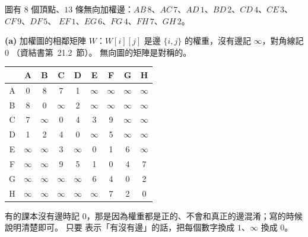 \begin{pastsoln}
圖有 $8$ 個頂點、$13$ 條無向加權邊：$AB\,8$、$AC\,7$、$AD\,1$、$BD\,2$、$CD\,4$、$CE\,3$、$CF\,9$、$DF\,5$、
$EF\,1$、$EG\,6$、$FG\,4$、$FH\,7$、$GH\,2$。

\textbf{(a)} 加權圖的相鄰矩陣 $W$：$W[i][j]$ 是邊 $\{i, j\}$ 的權重，沒有邊記 $\infty$，對角線記 $0$
（資結書第~21.2~節）。 無向圖的矩陣是對稱的。
\begin{center}
\begin{tabular}{c|*{8}{c}}
 & A & B & C & D & E & F & G & H \\
\hline
A & 0 & 8 & 7 & 1 & $\infty$ & $\infty$ & $\infty$ & $\infty$ \\
B & 8 & 0 & $\infty$ & 2 & $\infty$ & $\infty$ & $\infty$ & $\infty$ \\
C & 7 & $\infty$ & 0 & 4 & 3 & 9 & $\infty$ & $\infty$ \\
D & 1 & 2 & 4 & 0 & $\infty$ & 5 & $\infty$ & $\infty$ \\
E & $\infty$ & $\infty$ & 3 & $\infty$ & 0 & 1 & 6 & $\infty$ \\
F & $\infty$ & $\infty$ & 9 & 5 & 1 & 0 & 4 & 7 \\
G & $\infty$ & $\infty$ & $\infty$ & $\infty$ & 6 & 4 & 0 & 2 \\
H & $\infty$ & $\infty$ & $\infty$ & $\infty$ & $\infty$ & 7 & 2 & 0 \\
\end{tabular}
\end{center}
有的課本沒有邊時記 $0$，那是因為權重都是正的、不會和真正的邊混淆；寫的時候說明清楚即可。 只要
表示「有沒有邊」的話，把每個數字換成 $1$、$\infty$ 換成 $0$。


\end{pastsoln}
